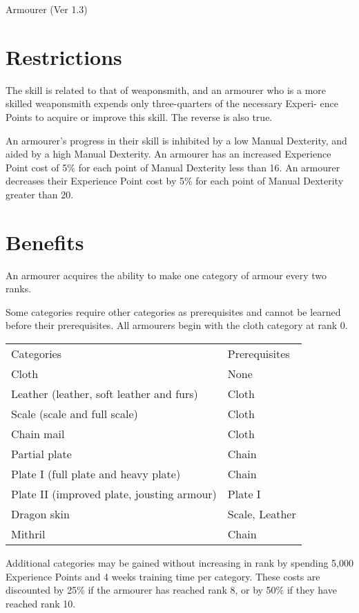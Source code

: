\begin{Chapter}{Armourer (Ver 1.3)}

\section{Restrictions}

The skill is related to that of weaponsmith, and an armourer who is a
more skilled weaponsmith expends only three-quarters of the necessary
Experi- ence Points to acquire or improve this skill.  The reverse is
also true.

An armourer’s progress in their skill is inhibited by a low Manual
Dexterity, and aided by a high Manual Dexterity.  An armourer has an
increased Experience Point cost of 5\% for each point of Manual
Dexterity less than 16. An armourer decreases their Experience Point
cost by 5\% for each point of Manual Dexterity greater than 20.

\section{Benefits}

An armourer acquires the ability to make one category of armour every
two ranks.

Some categories require other categories as prerequisites and cannot
be learned before their prerequisites.  All armourers begin with the
cloth category at rank 0.

\begin{tabularx}{\columnwidth}{Xl} \\
Categories					& Prerequisites \\
Cloth						& None \\
Leather (leather, soft leather and furs)	& Cloth \\
Scale (scale and full scale)			& Cloth \\
Chain mail					& Cloth \\
Partial plate					& Chain  \\
Plate I (full plate and heavy plate)		& Chain \\
Plate II (improved plate, jousting armour)	& Plate I \\
Dragon skin					& Scale, Leather \\
Mithril						& Chain \\
\end{tabularx}

Additional categories may be gained without increasing in rank by
spending 5,000 Experience Points and 4 weeks training time per
category.  These costs are discounted by 25\% if the armourer has
reached rank 8, or by 50\% if they have reached rank 10.


\end{Chapter}
